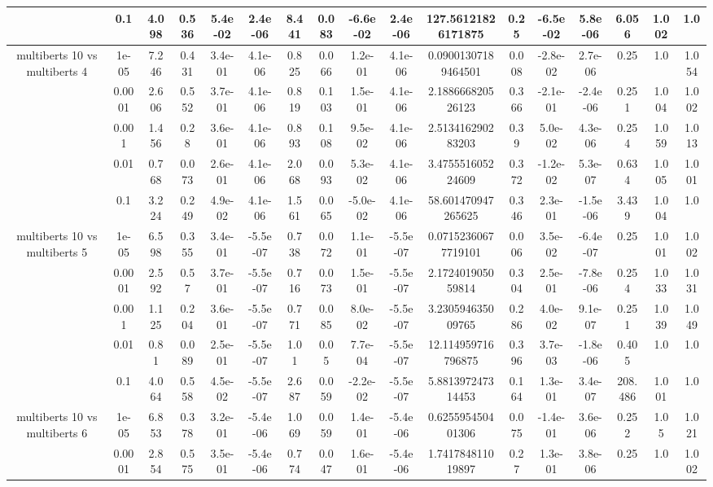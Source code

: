 \begin{tabular}{|c|c|c|c|c|c|c|c|c|c|c|c|c|c|c|c|c|}
 & 0.1 & 4.098 & 0.536 & 5.4e-02 & 2.4e-06 & 8.441 & 0.083 & -6.6e-02 & 2.4e-06 & 127.56121826171875 & 0.25 & -6.5e-02 & 5.8e-06 & 6.056 & 1.002 & 1.0 \\
\hline
\multirow{5}{*}{multiberts 10 vs multiberts 4} & 1e-05 & 7.246 & 0.431 & 3.4e-01 & 4.1e-06 & 0.825 & 0.066 & 1.2e-01 & 4.1e-06 & 0.09001307189464501 & 0.008 & -2.8e-02 & 2.7e-06 & 0.25 & 1.0 & 1.054 \\
 & 0.0001 & 2.606 & 0.552 & 3.7e-01 & 4.1e-06 & 0.819 & 0.103 & 1.5e-01 & 4.1e-06 & 2.188666820526123 & 0.366 & -2.1e-01 & -2.4e-06 & 0.251 & 1.004 & 1.002 \\
 & 0.001 & 1.456 & 0.28 & 3.6e-01 & 4.1e-06 & 0.893 & 0.108 & 9.5e-02 & 4.1e-06 & 2.513416290283203 & 0.39 & 5.0e-02 & 4.3e-06 & 0.254 & 1.059 & 1.013 \\
 & 0.01 & 0.768 & 0.073 & 2.6e-01 & 4.1e-06 & 2.068 & 0.093 & 5.3e-02 & 4.1e-06 & 3.475551605224609 & 0.372 & -1.2e-02 & 5.3e-07 & 0.634 & 1.005 & 1.001 \\
 & 0.1 & 3.224 & 0.249 & 4.9e-02 & 4.1e-06 & 1.561 & 0.065 & -5.0e-02 & 4.1e-06 & 58.601470947265625 & 0.346 & 2.3e-01 & -1.5e-06 & 3.439 & 1.004 & 1.0 \\
\hline
\multirow{5}{*}{multiberts 10 vs multiberts 5} & 1e-05 & 6.598 & 0.355 & 3.4e-01 & -5.5e-07 & 0.738 & 0.072 & 1.1e-01 & -5.5e-07 & 0.07152360677719101 & 0.006 & 3.5e-02 & -6.4e-07 & 0.25 & 1.001 & 1.002 \\
 & 0.0001 & 2.592 & 0.57 & 3.7e-01 & -5.5e-07 & 0.716 & 0.073 & 1.5e-01 & -5.5e-07 & 2.172401905059814 & 0.304 & 2.5e-01 & -7.8e-06 & 0.254 & 1.033 & 1.031 \\
 & 0.001 & 1.125 & 0.204 & 3.6e-01 & -5.5e-07 & 0.771 & 0.085 & 8.0e-02 & -5.5e-07 & 3.230594635009765 & 0.286 & 4.0e-02 & 9.1e-07 & 0.251 & 1.039 & 1.049 \\
 & 0.01 & 0.81 & 0.089 & 2.5e-01 & -5.5e-07 & 1.01 & 0.05 & 7.7e-04 & -5.5e-07 & 12.114959716796875 & 0.396 & 3.7e-03 & -1.8e-06 & 0.405 & 1.0 & 1.0 \\
 & 0.1 & 4.064 & 0.558 & 4.5e-02 & -5.5e-07 & 2.687 & 0.059 & -2.2e-02 & -5.5e-07 & 5.881397247314453 & 0.164 & 1.3e-01 & 3.4e-07 & 208.486 & 1.001 & 1.0 \\
\hline
\multirow{5}{*}{multiberts 10 vs multiberts 6} & 1e-05 & 6.853 & 0.378 & 3.2e-01 & -5.4e-06 & 1.069 & 0.059 & 1.4e-01 & -5.4e-06 & 0.625595450401306 & 0.075 & -1.4e-01 & 3.6e-06 & 0.252 & 1.05 & 1.021 \\
 & 0.0001 & 2.854 & 0.575 & 3.5e-01 & -5.4e-06 & 0.774 & 0.047 & 1.6e-01 & -5.4e-06 & 1.741784811019897 & 0.27 & 1.3e-01 & 3.8e-06 & 0.25 & 1.0 & 1.002 \\

\end{tabular}

